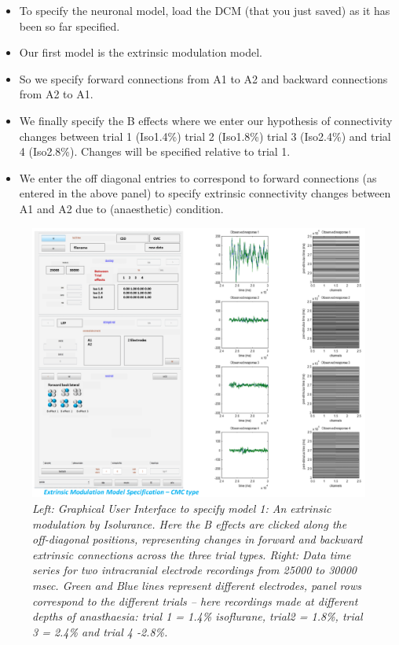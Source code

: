 \begin{itemize}
\item To specify the neuronal model, load the DCM (that you just saved) as it has been so far specified. 
\item Our first model is the extrinsic modulation model. 
\item So we specify forward connections from A1 to A2 and backward connections from A2 to A1. 
\item We finally specify the B effects where we enter our hypothesis of connectivity changes between trial 1 (Iso1.4\%) trial 2 (Iso1.8\%) trial 3 (Iso2.4\%) and trial 4 (Iso2.8\%). Changes will be specified relative to trial 1. 
\item We enter the off diagonal entries to correspond to forward connections (as entered in the above panel) to specify extrinsic connectivity changes between A1 and A2 due to (anaesthetic) condition. 
\end{itemize}

\begin{figure}
\begin{center}
\includegraphics[width=140mm]{dcm_csd/dcm_csd_fig1}
\caption{\em Left: Graphical User Interface to specify model 1: An extrinsic modulation by Isolurance. Here the B effects are clicked along the off-diagonal positions, representing changes in forward and backward extrinsic connections across the three trial types.
Right: Data time series for two intracranial electrode recordings from 25000 to 30000 msec. Green and Blue lines represent different electrodes, panel rows correspond to the different trials -- here recordings made at different depths of anasthaesia: trial 1 = 1.4\% isoflurane, trial2 = 1.8\%, trial 3 = 2.4\% and trial 4 -2.8\%.  \label{dcm_ssr:fig1}}
\end{center}
\end{figure}

